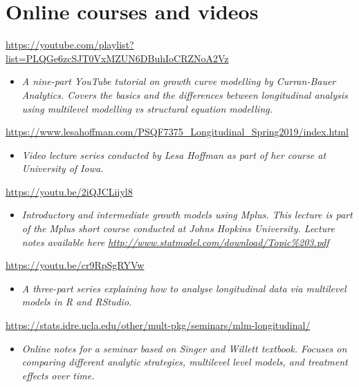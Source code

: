 \documentclass[
]{book}
\providecommand{\tightlist}{%
  \setlength{\itemsep}{0pt}\setlength{\parskip}{0pt}}
\begin{document}
\hypertarget{online-courses-and-videos-1}{%
\section{Online courses and videos}\label{online-courses-and-videos-1}}

\url{https://youtube.com/playlist?list=PLQGe6zcSJT0VxMZUN6DBuhIoCRZNoA2Vz}

\begin{itemize}
\tightlist
\item
  \emph{A nine-part YouTube tutorial on growth curve modelling by Curran-Bauer Analytics. Covers the basics and the differences between longitudinal analysis using multilevel modelling vs structural equation modelling.}
\end{itemize}

\url{https://www.lesahoffman.com/PSQF7375_Longitudinal_Spring2019/index.html}

\begin{itemize}
\tightlist
\item
  \emph{Video lecture series conducted by Lesa Hoffman as part of her course at University of Iowa. }
\end{itemize}

\url{https://youtu.be/2iQJCLiiyl8}

\begin{itemize}
\tightlist
\item
  \emph{Introductory and intermediate growth models using Mplus. This lecture is part of the Mplus short course conducted at Johns Hopkins University. Lecture notes available here \url{http://www.statmodel.com/download/Topic\%203.pdf} }
\end{itemize}

\url{https://youtu.be/cr9RpSgRYVw}

\begin{itemize}
\tightlist
\item
  \emph{A three-part series explaining how to analyse longitudinal data via multilevel models in R and RStudio.}
\end{itemize}

\url{https://stats.idre.ucla.edu/other/mult-pkg/seminars/mlm-longitudinal/}

\begin{itemize}
\tightlist
\item
  \emph{Online notes for a seminar based on Singer and Willett textbook. Focuses on comparing different analytic strategies, multilevel level models, and treatment effects over time. }
\end{itemize}
\end{document}
